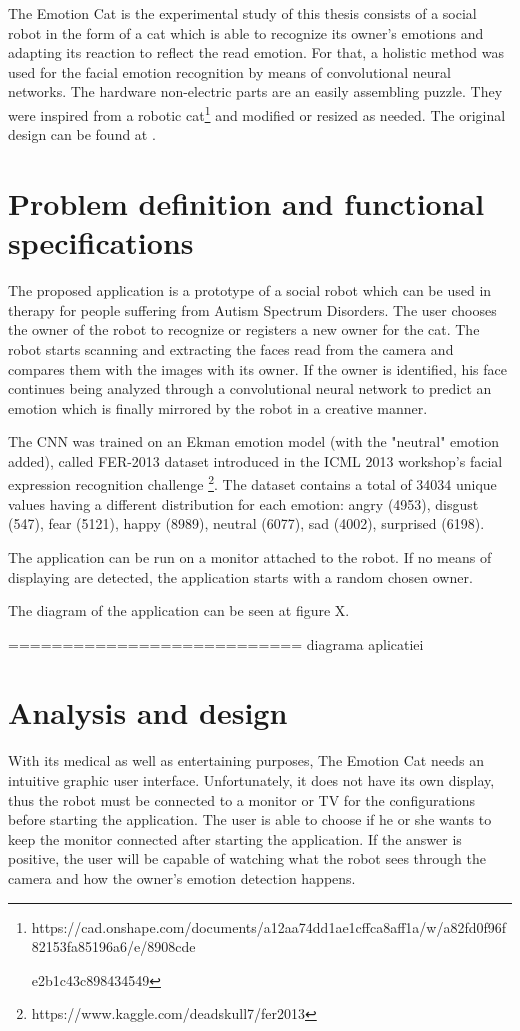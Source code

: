 \documentclass[runningheads,a4paper,12pt]{report}
\begin{document}
The Emotion Cat is the experimental study of this thesis consists of a social robot in the form of a cat which is able to recognize its owner's emotions and adapting its reaction to reflect the read emotion. For that, a holistic method was used for the facial emotion recognition by means of convolutional neural networks. The hardware non-electric parts are an easily assembling puzzle. They were inspired from a robotic cat\footnote{https://cad.onshape.com/documents/a12aa74dd1ae1cffca8aff1a/w/a82fd0f96f82153fa85196a6/e/8908cde

e2b1c43c898434549} and modified or resized as needed. The original design can be found at \cite{nybble}.

\section{Problem definition and functional specifications}
\label{chapter:definition}
The proposed application is a prototype of a social robot which can be used in therapy for people suffering from Autism Spectrum Disorders. The user chooses the owner of the robot to recognize or registers a new owner for the cat. The robot starts scanning and extracting the faces read from the camera and compares them with the images with its owner. If the owner is identified, his face continues being analyzed through a convolutional neural network to predict an emotion which is finally mirrored by the robot in a creative manner. 

The CNN was trained on an Ekman emotion model (with the "neutral" emotion added), called FER-2013 dataset introduced in the ICML 2013 workshop's facial expression recognition challenge \footnote{https://www.kaggle.com/deadskull7/fer2013}. The dataset contains a total of 34034 unique values having a different distribution for each emotion: angry (4953), disgust (547), fear (5121), happy (8989), neutral (6077), sad (4002), surprised (6198). 

The application can be run on a monitor attached to the robot. If no means of displaying are detected, the application starts with a random chosen owner. 

The diagram of the application can be seen at figure X.

=========================== diagrama aplicatiei

\section{Analysis and design}
\label{chapter:analysis}
With its medical as well as entertaining purposes, The Emotion Cat needs an intuitive graphic user interface. Unfortunately, it does not have its own display, thus the robot must be connected to a monitor or TV for the configurations before starting the application. The user is able to choose if he or she wants to keep the monitor connected after starting the application. If the answer is positive, the user will be capable of watching what the robot sees through the camera and how the owner's emotion detection happens.
\end{document}
